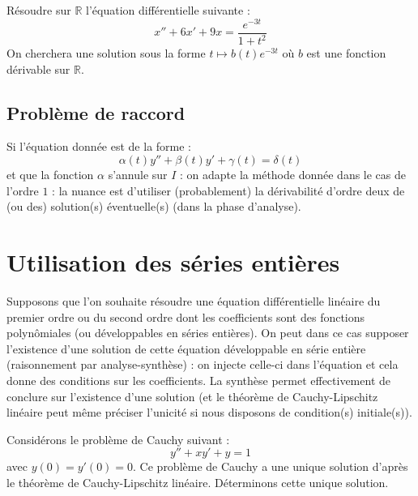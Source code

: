 \documentclass[french,11pt,twoside]{VcCours}
\begin{document}
\medskip

\begin{Exemple} Résoudre sur $\mathbb{R}$ l'équation différentielle suivante :
$$ x''+6x'+9x= \dfrac{e^{-3t}}{1+t^2}$$
On cherchera une solution sous la forme $t \mapsto b(t)e^{-3t}$ où $b$ est une fonction dérivable sur $\mathbb{R}$.

\vspace{11cm}
\end{Exemple}


\subsection{Problème de raccord}
Si l'équation donnée est de la forme :
$$ \alpha(t) y''+ \beta(t) y'+ \gamma(t) = \delta(t)$$
et que la fonction $\alpha$ s'annule sur $I$ : on adapte la méthode donnée dans le cas de l'ordre $1$ : la nuance est d'utiliser (probablement) la dérivabilité d'ordre deux de (ou des) solution(s) éventuelle(s) (dans la phase d'analyse).
\section{Utilisation des séries entières}
Supposons que l'on souhaite résoudre une équation différentielle linéaire du premier ordre ou du second ordre dont les coefficients sont des fonctions polynômiales (ou développables en séries entières). On peut dans ce cas supposer l'existence d'une solution de cette équation développable en série entière (raisonnement par analyse-synthèse) : on injecte celle-ci dans l'équation et cela donne des conditions sur les coefficients. La synthèse permet effectivement de conclure sur l'existence d'une solution (et le théorème de Cauchy-Lipschitz linéaire peut même préciser l'unicité si nous disposons de condition(s) initiale(s)).

\medskip

\begin{Exemple} Considérons le problème de Cauchy suivant :
$$ y''+xy'+y=1 $$
avec $y(0)=y'(0)=0$. Ce problème de Cauchy a une unique solution d'après le théorème de Cauchy-Lipschitz linéaire. Déterminons cette unique solution.

\vspace{10cm}
\end{Exemple}
\end{document}

